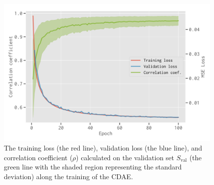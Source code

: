 \documentclass[letters,fleqn,usenatbib]{mnras}
\newlength{\myfigwidth}
\newcommand{\R}[1]{\mathrm{#1}}
\begin{document}
\begin{figure}
  \centering
  \includegraphics[width=\myfigwidth]{cdae-train}
  \caption{\label{fig:train}%
    The training loss (the red line), validation loss (the blue line),
    and correlation coefficient ($\rho$) calculated on the validation
    set $S_{\R{val}}$ (the green line with the shaded region representing
    the standard deviation) along the training of the CDAE.
  }
\end{figure}
\end{document}
